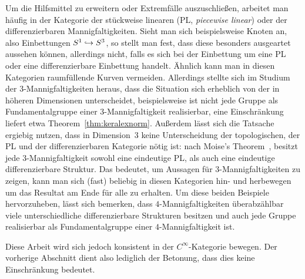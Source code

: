         Um die Hilfsmittel zu erweitern oder Extremfälle auszuschließen, arbeitet man häufig in der Kategorie der stückweise linearen (PL, \textit{piecewise linear}) oder der differenzierbaren Mannigfaltigkeiten. Sieht man sich beispielsweise Knoten an, also Einbettungen $S^1 \hookrightarrow S^3$, so stellt man fest, dass diese besonders ausgeartet aussehen können, allerdings nicht, falls es sich bei der Einbettung um eine PL oder eine differenzierbare Einbettung handelt. Ähnlich kann man in diesen Kategorien raumfüllende Kurven vermeiden. Allerdings stellte sich im Studium der $3$-Mannigfaltigkeiten heraus, dass die Situation sich erheblich von der in höheren Dimensionen unterscheidet, beispielsweise ist nicht jede Gruppe als Fundamentalgruppe einer $3$-Mannigfaltigkeit realisierbar, eine Einschränkung liefert etwa Theorem~\ref{thm:keralexnorm}. Außerdem lässt sich die Tatsache ergiebig nutzen, dass in Dimension~$3$ keine Unterscheidung der topologischen, der PL und der differenzierbaren Kategorie nötig ist: nach Moise's Theorem~\cite{Moise.1952}, besitzt jede $3$-Mannigfaltigkeit sowohl eine eindeutige PL, als auch eine eindeutige differenzierbare Struktur. Das bedeutet, um Aussagen für $3$-Mannigfaltigkeiten zu zeigen, kann man sich (fast) beliebig in diesen Kategorien hin- und herbewegen um das Resultat am Ende für alle zu erhalten. Um diese beiden Beispiele hervorzuheben, lässt sich bemerken, dass $4$-Mannigfaltigkeiten überabzählbar viele unterschiedliche differenzierbare Strukturen besitzen und auch jede Gruppe realisierbar als Fundamentalgruppe einer $4$-Mannigfaltigkeit ist.

        Diese Arbeit wird sich jedoch konsistent in der $C^\infty$-Kategorie bewegen. Der vorherige Abschnitt dient also lediglich der Betonung, dass dies keine Einschränkung bedeutet. 


